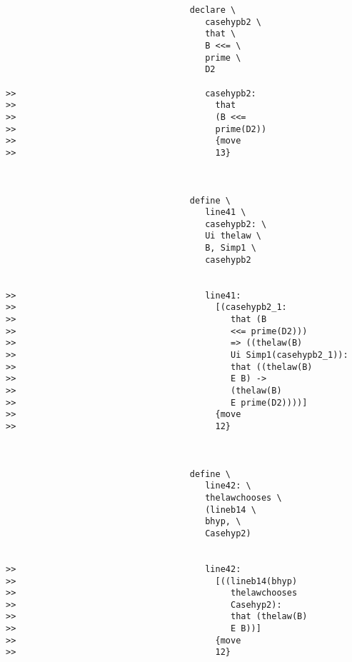 \documentclass[12pt]{article}
\begin{document}
\begin{verbatim}
                                    declare \
                                       casehypb2 \
                                       that \
                                       B <<= \
                                       prime \
                                       D2

>>                                     casehypb2:
>>                                       that
>>                                       (B <<=
>>                                       prime(D2))
>>                                       {move
>>                                       13}



                                    define \
                                       line41 \
                                       casehypb2: \
                                       Ui thelaw \
                                       B, Simp1 \
                                       casehypb2


>>                                     line41:
>>                                       [(casehypb2_1:
>>                                          that (B
>>                                          <<= prime(D2)))
>>                                          => ((thelaw(B)
>>                                          Ui Simp1(casehypb2_1)):
>>                                          that ((thelaw(B)
>>                                          E B) ->
>>                                          (thelaw(B)
>>                                          E prime(D2))))]
>>                                       {move
>>                                       12}



                                    define \
                                       line42: \
                                       thelawchooses \
                                       (lineb14 \
                                       bhyp, \
                                       Casehyp2)


>>                                     line42:
>>                                       [((lineb14(bhyp)
>>                                          thelawchooses
>>                                          Casehyp2):
>>                                          that (thelaw(B)
>>                                          E B))]
>>                                       {move
>>                                       12}




\end{verbatim}
\end{document}
